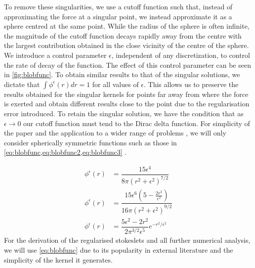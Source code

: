 To remove these singularities, we use a cutoff function \cite{Cortez2001,Cortez2005} such that, instead of approximating the force at a singular point, we instead approximate it as a sphere centred at the same point. While the radius of the sphere is often infinite, the magnitude of the cutoff function decays rapidly away from the centre with the largest contribution obtained in the close vicinity of the centre of the sphere. We introduce a control parameter $\epsilon$, independent of any discretization, to control the rate of decay of the function. The effect of this control parameter can be seen in \cref{fig:blobfunc}. To obtain similar results to that of the singular solutions, we dictate that $\int \phi^\epsilon(r)dr=1$ for all values of $\epsilon$. This allows us to preserve the results obtained for the singular kernels for points far away from where the force is exerted and obtain different results close to the point due to the regularisation error introduced. To retain the singular solution, we have the condition that as $\epsilon \to 0$ our cutoff function must tend to the Dirac delta function. For simplicity of the paper and the application to a wider range of problems \cite{Olson2013ModelingFormulation}, we will only consider spherically symmetric functions such as those in \cref{eq:blobfunc,eq:blobfunc2,eq:blobfunc3} \cite{Olson2013ModelingFormulation,Nguyen2014ReductionFlow,Zhao2019}.

\begin{align}
    \label{eq:blobfunc}\phi^\epsilon(r) &= \dfrac{15 \epsilon^4}{8\pi\left( r^2 +\epsilon^2 \right)^{7/2}} \\
    \label{eq:blobfunc2}\phi^{\epsilon}(r) &= \dfrac{15 \epsilon^{6}\left(5-\frac{2 r^{2}}{\epsilon^{2}}\right)}{16 \pi\left(r^{2}+\epsilon^{2}\right)^{9 / 2}}\\
    \label{eq:blobfunc3}\phi^{\epsilon}(r) &= \dfrac{5 \epsilon^{2}-2 r^{2}}{2 \pi^{3 / 2} \epsilon^{5}} e^{-r^{2} / \epsilon^{2}} 
\end{align}   
For the derivation of the regularised stokeslets and all further numerical analysis, we will use \cref{eq:blobfunc} due to its popularity in external literature and the simplicity of the kernel it generates.

